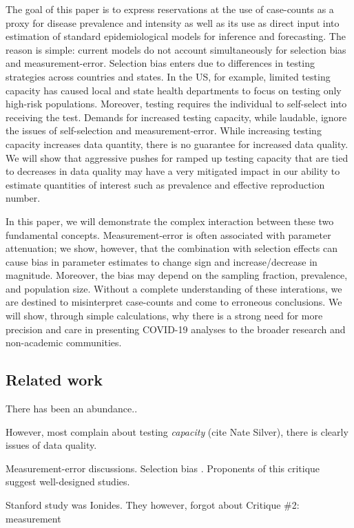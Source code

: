 \documentclass[aoas]{amsart}
\begin{document}
The goal of this paper is to express reservations at the use of case-counts as a proxy for disease prevalence and intensity as well as its use as direct input into estimation of standard epidemiological models for inference and forecasting.  The reason is simple: current models do not account simultaneously for selection bias and measurement-error. Selection bias enters due to differences in testing strategies across countries and states.  In the US, for example, limited testing capacity has caused local and state health departments to focus on testing only high-risk populations.  Moreover, testing requires the individual to self-select into receiving the test.  Demands for increased testing capacity, while laudable, ignore the issues of self-selection and measurement-error. While increasing testing capacity increases data quantity, there is no guarantee for increased data quality.  We will show that aggressive pushes for ramped up testing capacity that are tied to decreases in data quality may have a very mitigated impact  in our ability to estimate quantities of interest such as prevalence and effective reproduction number.

In this paper, we will demonstrate the complex interaction between these two fundamental concepts.  Measurement-error is often associated with parameter attenuation; we show, however, that the combination with selection effects can cause bias in parameter estimates to change sign and increase/decrease in magnitude.  Moreover, the bias may depend on the sampling fraction, prevalence, and population size.  Without a complete understanding of these interations, we are destined to misinterpret case-counts and come to erroneous conclusions.   We will show, through simple calculations, why there is a strong need for more precision and care in presenting COVID-19 analyses to the broader research and non-academic communities.

\subsection{Related work}

There has been an abundance..

However, most complain about testing \emph{capacity} (cite Nate Silver), there is clearly issues of data quality.

Measurement-error discussions.
Selection bias . Proponents of this critique suggest well-designed studies.

Stanford study was Ionides.  They however, forgot about Critique \#2: measurement
\end{document}

